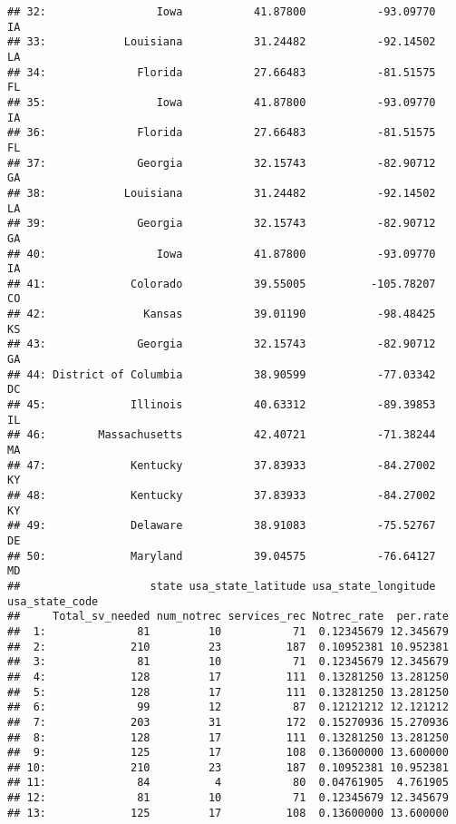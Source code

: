 \documentclass[
]{article}
\begin{document}
\begin{verbatim}
## 32:                 Iowa           41.87800           -93.09770             IA
## 33:            Louisiana           31.24482           -92.14502             LA
## 34:              Florida           27.66483           -81.51575             FL
## 35:                 Iowa           41.87800           -93.09770             IA
## 36:              Florida           27.66483           -81.51575             FL
## 37:              Georgia           32.15743           -82.90712             GA
## 38:            Louisiana           31.24482           -92.14502             LA
## 39:              Georgia           32.15743           -82.90712             GA
## 40:                 Iowa           41.87800           -93.09770             IA
## 41:             Colorado           39.55005          -105.78207             CO
## 42:               Kansas           39.01190           -98.48425             KS
## 43:              Georgia           32.15743           -82.90712             GA
## 44: District of Columbia           38.90599           -77.03342             DC
## 45:             Illinois           40.63312           -89.39853             IL
## 46:        Massachusetts           42.40721           -71.38244             MA
## 47:             Kentucky           37.83933           -84.27002             KY
## 48:             Kentucky           37.83933           -84.27002             KY
## 49:             Delaware           38.91083           -75.52767             DE
## 50:             Maryland           39.04575           -76.64127             MD
##                    state usa_state_latitude usa_state_longitude usa_state_code
##     Total_sv_needed num_notrec services_rec Notrec_rate  per.rate
##  1:              81         10           71  0.12345679 12.345679
##  2:             210         23          187  0.10952381 10.952381
##  3:              81         10           71  0.12345679 12.345679
##  4:             128         17          111  0.13281250 13.281250
##  5:             128         17          111  0.13281250 13.281250
##  6:              99         12           87  0.12121212 12.121212
##  7:             203         31          172  0.15270936 15.270936
##  8:             128         17          111  0.13281250 13.281250
##  9:             125         17          108  0.13600000 13.600000
## 10:             210         23          187  0.10952381 10.952381
## 11:              84          4           80  0.04761905  4.761905
## 12:              81         10           71  0.12345679 12.345679
## 13:             125         17          108  0.13600000 13.600000

\end{verbatim}
\end{document}
